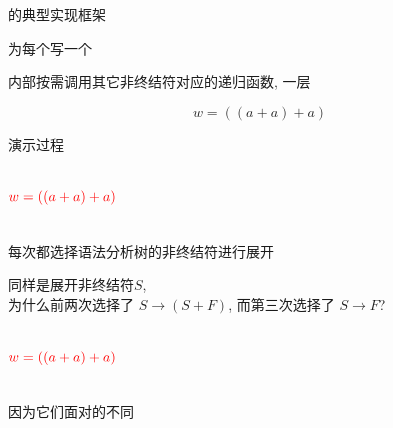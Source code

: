 \begin{frame}{}
  \begin{center}
    {\large {}的典型实现框架}


    为每个写一个

    \vspace{0.20cm}
    内部按需调用其它非终结符对应的递归函数, 一层
  \end{center}
\end{frame}

\begin{frame}{}
  \begin{center}
    
    \[
      w = ((a + a) + a)
    \]
  \end{center}
\end{frame}

\begin{frame}{}
  \begin{center}
    演示过程

    \begin{columns}
        

        \vspace{-0.80cm}
        \[
          \textcolor{red}{w = ((a + a) + a)}
        \]
    \end{columns}

    \pause
    \vspace{0.30cm}
    每次都选择语法分析树的非终结符进行展开
  \end{center}
\end{frame}

\begin{frame}{}
  \begin{center}
    同样是展开非终结符$S$, \\[4pt]
    为什么前两次选择了 $S \to (S + F)$, 而第三次选择了 $S \to F$?

    \begin{columns}
        

        \vspace{-0.80cm}
        \[
          \textcolor{red}{w = ((a + a) + a)}
        \]
    \end{columns}

    \pause
    \vspace{0.50cm}
    因为它们面对的不同
  \end{center}
\end{frame}

